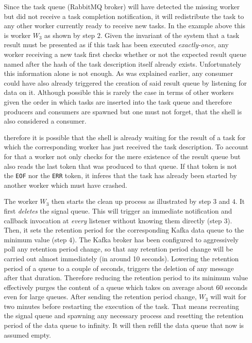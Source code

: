 Since the task queue (RabbitMQ broker) will have detected the
missing worker but did not receive a task completion notification,
it will redistribute the task to any other worker currently
ready to receive new tasks. In the example above this is worker
$W_{3}$ as shown by step $2$. Given the invariant of the system
that a task result must be presented as if this task has been
executed \textit{exactly-once}, any worker receiving a new task
first checks whether or not the expected result queue named after
the hash of the task description itself already exists.
Unfortunately this information alone is not enough. As was
explained earlier, any consumer could have also already triggered
the creation of said result queue by listening for data on it.
Although possible this is rarely the case in terms of other workers
given the order in which tasks are inserted into the task queue
and therefore producers and consumers are spawned but one must not
forget, that the shell is also considered a consumer.

therefore it is possible that the shell is already waiting for
the result of a task for which the corresponding worker has
just received the task description. To account for that a worker
not only checks for the mere existence of the result queue but also
reads the last token that was produced to that queue. If that
token is not the \texttt{EOF} nor the \texttt{ERR} token, it inferes
that the task has already been started by another worker which
must have crashed.

The worker $W_{3}$ then starts the clean up process as illustrated
by step $3$ and $4$. It first \textit{deletes} the signal queue.
This will trigger an immediate notification and callback invocation
at \textit{every} listener without knowing them directly (step $3$).
Then, it sets the retention period for the corresponding Kafka
data queue to the minimum value (step $4$). The Kafka broker has been
configured to aggressively poll any retention period change, so that any
retention period change will be carried out almost immediately
(in around 10 seconds). Lowering the retention period of a queue
to a couple of seconds, triggers the deletion of any message after
that duration. Therefore reducing the retention period to its minimum
value effectively purges the content of a queue which takes on average
about $60$ seconds even for large queues.
After sending the retention period change, $W_{3}$ will wait for
two minutes before restarting the execution of the task. That
means recreating the signal queue and spawning any necessary
process and resetting the retention period of the data queue to
infinity. It will then refill the data queue that now is assumed
empty.

